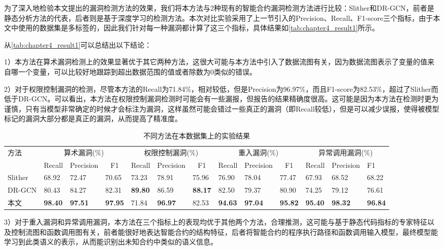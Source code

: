 为了深入地检验本文提出的漏洞检测方法的效果，我们将本方法与2种现有的智能合约漏洞检测方法进行比较：Slither\cite{slither}和DR-GCN\cite{liu2021smart}，前者是静态分析方法的代表，后者则是基于深度学习的检测方法。本次对比实验采用了上一节引入的Precision、Recall、F1-score三个指标，由于本文中使用的数据集是多标签的，因此我们针对每一种漏洞都计算了这三个指标，具体结果如\autoref{tab:chapter4_result1}所示。


从\autoref{tab:chapter4_result1}可以总结出以下结论：

1）本方法在算术漏洞检测上的效果显著优于其它两种方法，这很大可能与本方法中引入了数据流图有关，因为数据流图表示了变量的值来自哪一个变量，可以比较好地跟踪到超出数据范围的值或者除数为0类似的错误。

2）对于权限控制漏洞的检测，尽管本方法的Recall为71.84\%，相对较低，但是Precision为96.97\%，而且F1-score为82.53\%，超过了Slither而低于DR-GCN。可以看出，本方法在权限控制漏洞检测时可能会有一些漏报，但报告的结果精确度很高。这可能是因为本方法在检测时更为谨慎，只有当模型非常确定的时候才会标注为漏洞，这样虽然可能会错过一些真正的漏洞（即Recall较低），但是可以减少误报，使得被模型标记的漏洞大部分都是真正的漏洞，从而提高了精准度。
\begin{table}[htbp]
    \caption{\label{tab:chapter4_result1}不同方法在本数据集上的实验结果}
    \fontsize{8pt}{10pt}\selectfont
    \renewcommand{\arraystretch}{1.5}
    \begin{tabularx}{\linewidth}{p{1.3cm}|X<{\centering}X<{\centering}X<{\centering}|X<{\centering}X<{\centering}X<{\centering}|X<{\centering}X<{\centering}X<{\centering}|X<{\centering}X<{\centering}X<{\centering}}
        \hline
        \multirow{2}{*}{方法} & \multicolumn{3}{c|}{算术漏洞(\%)} & \multicolumn{3}{c|}{权限控制漏洞(\%)} & \multicolumn{3}{c|}{重入漏洞(\%)} & \multicolumn{3}{c}{异常调用漏洞(\%)} \\ \cline{2-13} 
                            & {Recall} & {Precision} & \multicolumn{1}{c|}{F1} & {Recall} & {Precision} & \multicolumn{1}{c|}{F1} & {Recall} & {Precision} & \multicolumn{1}{c|}{F1} & {Recall} & {Precision} & {F1} \\ \hline
        Slither & 68.92 & 72.47 & 70.65       & 73.23 & 78.91 & 75.96       & 76.90 & 78.04 & 77.47       & 67.93 & 68.52 & 68.22      \\
        DR-GCN & 80.43 & 84.27 & 82.31       & \textbf{89.80} & 86.59 & \textbf{88.17} & 82.50 & 79.37 & 80.90       & 74.25 & 79.12 & 76.61      \\
        本文      & \textbf{98.40} & \textbf{97.51}    & \textbf{97.95} & 71.84 & \textbf{96.97}    & 82.53       & \textbf{94.63} & \textbf{97.04}    & \textbf{95.82} & \textbf{95.40} & \textbf{98.32}    & \textbf{96.84}         \\ \hline
        \end{tabularx}
\end{table}
3）对于重入漏洞和异常调用漏洞，本方法在三个指标上的表现均优于其他两个方法，合理推测，这可能与基于静态代码指标的专家特征以及控制流图和函数调用图有关，前者能很好地表达智能合约的结构特征，后者将智能合约的程序执行路径和函数调用输入模型，最终模型能学习到此类语义的表示，从而能识别出未知合约中类似的语义信息。

